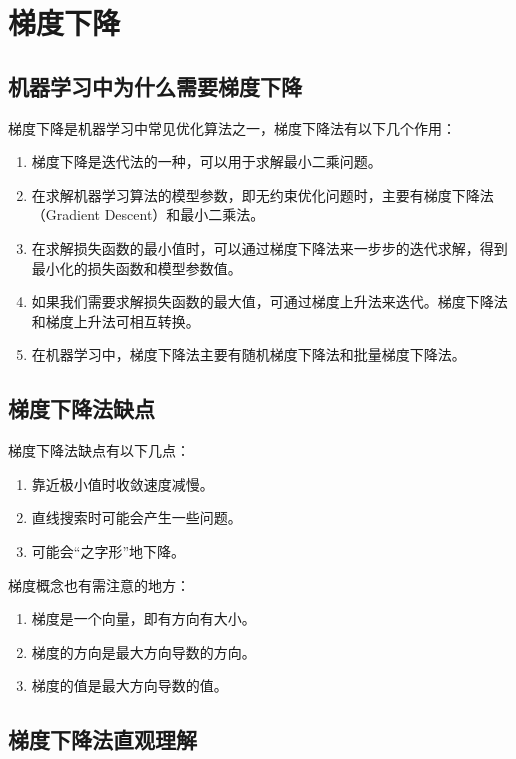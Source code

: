 \section{梯度下降}

\subsection{机器学习中为什么需要梯度下降}


梯度下降是机器学习中常见优化算法之一，梯度下降法有以下几个作用：

\begin{enumerate}
\itemsep0em 
\item 梯度下降是迭代法的一种，可以用于求解最小二乘问题。
\item 在求解机器学习算法的模型参数，即无约束优化问题时，主要有梯度下降法（Gradient Descent）和最小二乘法。
\item 在求解损失函数的最小值时，可以通过梯度下降法来一步步的迭代求解，得到最小化的损失函数和模型参数值。
\item 如果我们需要求解损失函数的最大值，可通过梯度上升法来迭代。梯度下降法和梯度上升法可相互转换。
\item 在机器学习中，梯度下降法主要有随机梯度下降法和批量梯度下降法。
\end{enumerate}

\subsection{梯度下降法缺点}

梯度下降法缺点有以下几点：

\begin{enumerate}
\itemsep0em 
\item 靠近极小值时收敛速度减慢。
\item 直线搜索时可能会产生一些问题。
\item 可能会``之字形''地下降。
\end{enumerate}

梯度概念也有需注意的地方：

\begin{enumerate}
\itemsep0em 
\item 梯度是一个向量，即有方向有大小。 
\item 梯度的方向是最大方向导数的方向。 
\item 梯度的值是最大方向导数的值。
\end{enumerate}

\subsection{梯度下降法直观理解}

